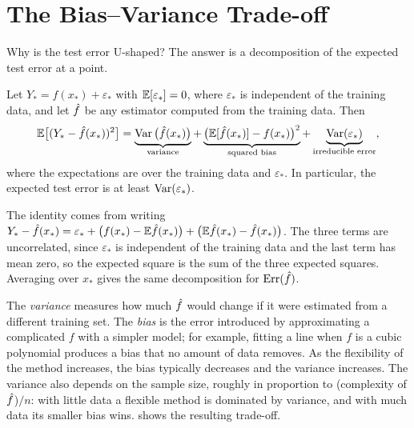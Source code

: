 \section{The Bias--Variance Trade-off}\label{sec:bias-variance}

Why is the test error U-shaped? The answer is a decomposition of the expected test error at a point.

\begin{theorem}\label{thm:bias-variance}
Let $Y_*=f(x_*)+\varepsilon_*$ with $\mathbb{E}[\varepsilon_*]=0$, where $\varepsilon_*$ is independent of the training data, and let $\hat f$ be any estimator computed from the training data. Then
\[
\mathbb{E}\big[(Y_*-\hat f(x_*))^2\big]=\underbrace{\operatorname{Var}\big(\hat f(x_*)\big)}_{\text{variance}}+\underbrace{\big(\mathbb{E}[\hat f(x_*)]-f(x_*)\big)^2}_{\text{squared bias}}+\underbrace{\operatorname{Var}(\varepsilon_*)}_{\text{irreducible error}},
\]
where the expectations are over the training data and $\varepsilon_*$. In particular, the expected test error is at least $\operatorname{Var}(\varepsilon_*)$.
\end{theorem}

The identity comes from writing $Y_*-\hat f(x_*)=\varepsilon_*+\big(f(x_*)-\mathbb{E}\hat f(x_*)\big)+\big(\mathbb{E}\hat f(x_*)-\hat f(x_*)\big)$. The three terms are uncorrelated, since $\varepsilon_*$ is independent of the training data and the last term has mean zero, so the expected square is the sum of the three expected squares. Averaging over $x_*$ gives the same decomposition for $\operatorname{Err}(\hat f)$.

The \emph{variance} measures how much $\hat f$ would change if it were estimated from a different training set. The \emph{bias} is the error introduced by approximating a complicated $f$ with a simpler model; for example, fitting a line when $f$ is a cubic polynomial produces a bias that no amount of data removes. As the flexibility of the method increases, the bias typically decreases and the variance increases. The variance also depends on the sample size, roughly in proportion to (complexity of $\hat f$)$/n$: with little data a flexible method is dominated by variance, and with much data its smaller bias wins.  shows the resulting trade-off.

